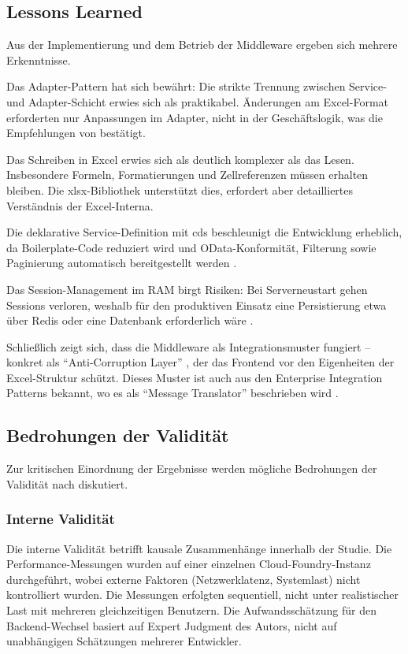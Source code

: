 \subsection{Lessons Learned}

Aus der Implementierung und dem Betrieb der Middleware ergeben sich mehrere Erkenntnisse.

Das Adapter-Pattern hat sich bewährt: Die strikte Trennung zwischen Service- und Adapter-Schicht erwies sich als praktikabel. Änderungen am Excel-Format erforderten nur Anpassungen im Adapter, nicht in der Geschäftslogik, was die Empfehlungen von \cite{gamma1994} bestätigt.

Das Schreiben in Excel erwies sich als deutlich komplexer als das Lesen. Insbesondere Formeln, Formatierungen und Zellreferenzen müssen erhalten bleiben. Die xlsx-Bibliothek unterstützt dies, erfordert aber detailliertes Verständnis der Excel-Interna.

Die deklarative Service-Definition mit \gls{cds} beschleunigt die Entwicklung erheblich, da Boilerplate-Code reduziert wird und OData-Konformität, Filterung sowie Paginierung automatisch bereitgestellt werden \citep{sap2024cap}.

Das Session-Management im RAM birgt Risiken: Bei Serverneustart gehen Sessions verloren, weshalb für den produktiven Einsatz eine Persistierung etwa über Redis oder eine Datenbank erforderlich wäre \citep{richardson2018}.

Schließlich zeigt sich, dass die Middleware als Integrationsmuster fungiert -- konkret als \enquote{Anti-Corruption Layer} \citep{vernon2013}, der das Frontend vor den Eigenheiten der Excel-Struktur schützt. Dieses Muster ist auch aus den Enterprise Integration Patterns bekannt, wo es als \enquote{Message Translator} beschrieben wird \citep{hohpe2003}.

\subsection{Bedrohungen der Validität}

Zur kritischen Einordnung der Ergebnisse werden mögliche Bedrohungen der Validität nach \cite{wohlin2012} diskutiert.

\subsubsection{Interne Validität}

Die interne Validität betrifft kausale Zusammenhänge innerhalb der Studie. Die Performance-Messungen wurden auf einer einzelnen Cloud-Foundry-Instanz durchgeführt, wobei externe Faktoren (Netzwerklatenz, Systemlast) nicht kontrolliert wurden. Die Messungen erfolgten sequentiell, nicht unter realistischer Last mit mehreren gleichzeitigen Benutzern. Die Aufwandsschätzung für den Backend-Wechsel basiert auf Expert Judgment des Autors, nicht auf unabhängigen Schätzungen mehrerer Entwickler.

